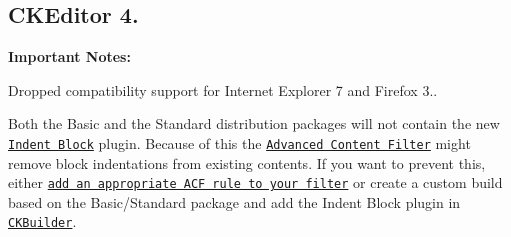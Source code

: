 \subsection*{C\-K\-Editor 4.}

{\bfseries Important Notes\-:}
\begin{DoxyItemize}
\item Dropped compatibility support for Internet Explorer 7 and Firefox 3..
\item Both the Basic and the Standard distribution packages will not contain the new \href{http://ckeditor.com/addon/indentblock}{\tt Indent Block} plugin. Because of this the \href{http://docs.ckeditor.com/#!/guide/dev_advanced_content_filter}{\tt Advanced Content Filter} might remove block indentations from existing contents. If you want to prevent this, either \href{http://docs.ckeditor.com/#!/guide/dev_allowed_content_rules}{\tt add an appropriate A\-C\-F rule to your filter} or create a custom build based on the Basic/\-Standard package and add the Indent Block plugin in \href{http://ckeditor.com/builder}{\tt C\-K\-Builder}.
\end{DoxyItemize}

